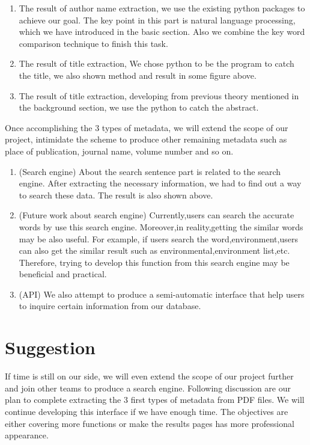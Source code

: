 		\begin{enumerate}
			\item The result of author name extraction, we use the existing python packages to achieve our goal.
			The key point in this part is natural language processing, which we have introduced in the basic section. 
			Also we combine the key word comparison technique to finish this task.
			\item The result of title extraction, We chose python to be the program to catch the title, we also shown method and result in some figure above.
			\item The result of title extraction, developing from previous theory mentioned in the background section, 
			we use the python to catch the abstract.
		\end{enumerate}	
Once accomplishing the 3 types of metadata, we will extend the scope of our project, intimidate the scheme to produce other remaining metadata such as place of publication, journal name, volume number and so on. 
		\begin{enumerate}
			\item (Search engine) About the search sentence part is related to the search engine. After extracting the necessary information, we had to find out a way to search these data. The result is also shown above.
			\item (Future work about search engine) Currently,users can search the accurate words by use this search engine.
			Moreover,in reality,getting the similar words may be also useful. 
			For example, if users search the word,environment,users can also get the similar result such as environmental,environment list,etc. Therefore, trying to develop this function from this search engine may be beneficial and practical.
			
			\item (API) We also attempt to produce a semi-automatic interface that help users to inquire certain information from our database.
		\end{enumerate}	

\section*{Suggestion}
If time is still on our side, we will even extend the scope of our project further and join other teams to produce a search engine. 
Following discussion are our plan to complete extracting the 3 first types of metadata from PDF files.
We will continue developing this interface if we have enough time. 
The objectives are either covering more functions or make the results pages has more professional appearance.
 
\newpage %